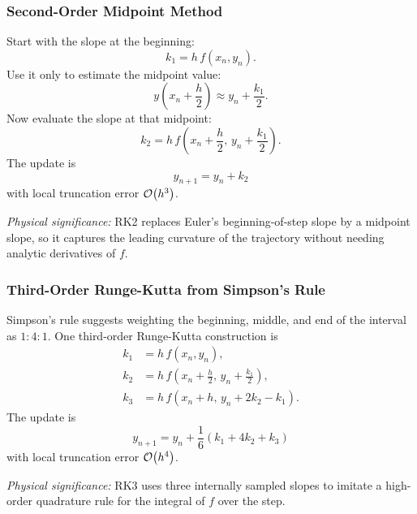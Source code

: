 \subsubsection{Second-Order Midpoint Method}
Start with the slope at the beginning:
\begin{equation}
    k_1=h\,f(x_n,y_n).
    \label{eq:lec06:rk2-k1}
\end{equation}
Use it only to estimate the midpoint value:
\begin{equation}
    y\left(x_n+\frac{h}{2}\right)
    \approx y_n+\frac{k_1}{2}.
    \label{eq:lec06:rk2-midpoint-estimate}
\end{equation}
Now evaluate the slope at that midpoint:
\begin{equation}
    k_2=h\,f\left(x_n+\frac{h}{2},\,y_n+\frac{k_1}{2}\right).
    \label{eq:lec06:rk2-k2}
\end{equation}
The update is
\begin{equation}
    \boxed{
    y_{n+1}=y_n+k_2}
    \label{eq:lec06:rk2-update}
\end{equation}
with local truncation error $\mathcal{O}\!\left(h^3\right)$.

\textit{Physical significance:} RK2 replaces Euler's beginning-of-step slope
by a midpoint slope, so it captures the leading curvature of the trajectory
without needing analytic derivatives of $f$.

\subsubsection{Third-Order Runge-Kutta from Simpson's Rule}
Simpson's rule suggests weighting the beginning, middle, and end of the
interval as $1:4:1$. One third-order Runge-Kutta construction is
\begin{align}
    k_1 &= h\,f(x_n,y_n),
    \label{eq:lec06:rk3-k1}\\
    k_2 &= h\,f\left(x_n+\frac{h}{2},\,y_n+\frac{k_1}{2}\right),
    \label{eq:lec06:rk3-k2}\\
    k_3 &= h\,f\left(x_n+h,\,y_n+2k_2-k_1\right).
    \label{eq:lec06:rk3-k3}
\end{align}
The update is
\begin{equation}
    \boxed{
    y_{n+1}=y_n+\frac{1}{6}\left(k_1+4k_2+k_3\right)}
    \label{eq:lec06:rk3-update}
\end{equation}
with local truncation error $\mathcal{O}\!\left(h^4\right)$.

\textit{Physical significance:} RK3 uses three internally sampled slopes to
imitate a high-order quadrature rule for the integral of $f$ over the step.

